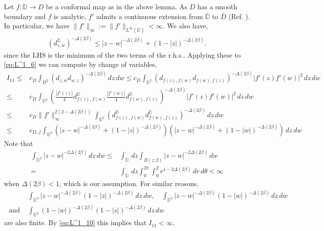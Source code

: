 \documentclass[a4paper, 11pt, reqno]{amsart}
\theoremstyle{definition} \newtheorem{defn}{Definition}[section]
\theoremstyle{remark} \newtheorem{rem}[defn]{Remark}
\theoremstyle{remark} \newtheorem*{rem*}{Remark}
\theoremstyle{plain} \newtheorem{thm}[defn]{Theorem}
\theoremstyle{plain} \newtheorem{lem}[defn]{Lemma}
\theoremstyle{plain} \newtheorem{prop}[defn]{Proposition}
\theoremstyle{plain} \newtheorem{cor}[defn]{Corollary}
\theoremstyle{remark} \newtheorem{exm}[defn]{\textbf{Example}}
\theoremstyle{remark} \newtheorem{exms}[defn]{\textbf{Examples}}
\theoremstyle{remark} \newtheorem*{bl}{}
\numberwithin{equation}{section} %
\newcommand{\D}{\mathbb{D}}
\begin{document}
		Let $f: \D \to D$ be a conformal map as in the above lemma. As $D$ has a smooth boundary and $f$ is analytic, $f'$ admits a continuous extension from $\bar{\D}$ to $\bar{ D}$ (Ref. \cite[Theorem 3.5]{pommerenke92}). In particular, we have $\lVert f' \rVert_{\infty} := \lVert f' \rVert_{L^{\infty}(\bar{\D})} < \infty$. We also have,
		\begin{align}
			(d^{\D}_{z,w})^{-\Delta(2\beta)} \le |z-w|^{-\Delta(2\beta)} + (1-|z|)^{-\Delta(2\beta)}.
		\end{align}
		since the LHS is the minimum of the two terms of the r.h.s.. Applying these to \eqref{eq:L^1_6} we can compute by change of variables,
		\begin{align} \label{eq:L^1_10}
			I_{11} \le &  c_D \int_{D^2} (d_{z,w}d_{w,z})^{-\Delta(2\beta)} \, dz \, dw
			\le  c_D \int_{\D^2} (d_{f(z),f(w)}d_{f(w),f(z)})^{-\Delta(2\beta)} |f'(z)f'(w)|^2 \, dz \, dw
			\nonumber \\
			\le & c_D \int_{\D^2} \left(\frac{|f'(z)|}{4}d^{\D}_{f(z),f(w)}\frac{|f'(w)|}{4}d^{\D}_{f(w),f(z)}\right)^{-\Delta(2\beta) } |f'(z)f'(w)|^2 \, dz \, dw
			\nonumber \\
			\le & c_D \lVert f' \rVert^{2(2-\Delta(2\beta))}_{\infty} \int_{\D^2} \left(d^{\D}_{f(z),f(w)}d^{\D}_{f(w),f(z)}\right)^{-\Delta(2\beta)}  \, dz \, dw
			\nonumber \\
			\le & c_{D,f} \int_{\D^2} \left( |z-w|^{-\Delta(2\beta)} + (1-|z|)^{-\Delta(2\beta)} \right) 
			 \left( |z-w|^{-\Delta(2\beta)} + (1-|w|)^{-\Delta(2\beta)} \right)  \, dz \, dw			
		\end{align}
		Note that 
		\begin{align}
			\int_{\D^2} |z-w|^{-2\Delta(2\beta) } \, dz \, dw  \le & \int_{\D} \,dz \int_{B(z;2)} |z-w|^{-2\Delta(2\beta) } \, dw
			\nonumber \\
			= &   \int_{\D} \,dz \int_0^{2\pi} \int_0^2 r^{1-2\Delta(2\beta)} \, dr \, d\theta < \infty
		\end{align}
		when $\Delta(2\beta) < 1$, which is our assumption. For similar reasons,
		\begin{align}
			& \int_{\D^2} |z-w|^{-\Delta(2\beta)} (1-|z|)^{-\Delta(2\beta)}\, dz \, dw, \quad \int_{\D^2} |z-w|^{-\Delta(2\beta) } (1-|w|)^{-\Delta(2\beta)}\, dz \, dw 
			\nonumber \\
			\text{ and } & \int_{\D^2} (1-|w|)^{-\Delta(2\beta)} (1-|z|)^{-\Delta(2\beta) }\, dz \, dw 
		\end{align}
		are also finite. By \eqref{eq:L^1_10} this implies that $I_{11} < \infty$. 
		
\end{document}
